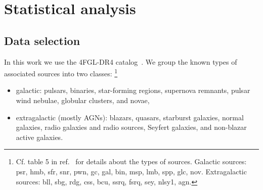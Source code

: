\documentclass[12pt, a4paper]{article}
\begin{document}
\section{Statistical analysis}
\label{sec:approach}

\subsection{Data selection}
\label{sec:data}


In this work we use the 4FGL-DR4 catalog~\cite{2022ApJS..260...53A, 2023arXiv230712546B}. We group the known types of associated sources into two classes:%
\footnote{Cf. table 5 in ref.~\cite{2022ApJS..260...53A} for details about the types of sources. Galactic sources: psr, hmb, sfr, snr, pwn, gc, gal, bin, msp, lmb, spp, glc, nov. Extragalactic sources: bll, sbg, rdg, css, bcu, ssrq, fsrq, sey, nlsy1, agn.}
\begin{itemize}
    \item galactic: pulsars, binaries, star-forming regions, supernova remnants, pulsar wind nebulae, globular clusters, and novae,
    \item extragalactic (mostly AGNs): blazars, quasars, starburst galaxies, normal galaxies, radio galaxies and radio sources, Seyfert galaxies, and non-blazar active galaxies.
\end{itemize}
\end{document}
